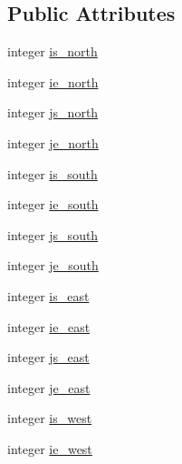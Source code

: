 \subsection*{Public Attributes}
\begin{DoxyCompactItemize}
\item 
integer \hyperlink{structfv__arrays__mod_1_1fv__regional__bc__bounds__type_a0f8c09e12e76033c808a3d6deb8b6774}{is\-\_\-north}
\item 
integer \hyperlink{structfv__arrays__mod_1_1fv__regional__bc__bounds__type_ab7c3cb5f65404b6883bbcc83e2bf9e42}{ie\-\_\-north}
\item 
integer \hyperlink{structfv__arrays__mod_1_1fv__regional__bc__bounds__type_a6c1b56a3e80896fc5145e1361807c31d}{js\-\_\-north}
\item 
integer \hyperlink{structfv__arrays__mod_1_1fv__regional__bc__bounds__type_a23a8fdcf24b84b603dab684fc87bb768}{je\-\_\-north}
\item 
integer \hyperlink{structfv__arrays__mod_1_1fv__regional__bc__bounds__type_a1946f18cfc16184c27bd77cad7325287}{is\-\_\-south}
\item 
integer \hyperlink{structfv__arrays__mod_1_1fv__regional__bc__bounds__type_acd8c3828a618efa6f9a7262b36c79148}{ie\-\_\-south}
\item 
integer \hyperlink{structfv__arrays__mod_1_1fv__regional__bc__bounds__type_ad8b75dda59b27edf80fc7ade6aa81153}{js\-\_\-south}
\item 
integer \hyperlink{structfv__arrays__mod_1_1fv__regional__bc__bounds__type_a8c5ab0960754f55008516230a1403e12}{je\-\_\-south}
\item 
integer \hyperlink{structfv__arrays__mod_1_1fv__regional__bc__bounds__type_a510bfddf983d15876a7819ebc3861291}{is\-\_\-east}
\item 
integer \hyperlink{structfv__arrays__mod_1_1fv__regional__bc__bounds__type_a34c26162b5ada53ebb8a5dd38ee6205d}{ie\-\_\-east}
\item 
integer \hyperlink{structfv__arrays__mod_1_1fv__regional__bc__bounds__type_aec5de2eb1fbc49c0ab3301f8a9833d43}{js\-\_\-east}
\item 
integer \hyperlink{structfv__arrays__mod_1_1fv__regional__bc__bounds__type_a0ec3990bb87f0052d6480199a51520d1}{je\-\_\-east}
\item 
integer \hyperlink{structfv__arrays__mod_1_1fv__regional__bc__bounds__type_a3a14693363d3959083d86452ba8f6fd6}{is\-\_\-west}
\item 
integer \hyperlink{structfv__arrays__mod_1_1fv__regional__bc__bounds__type_a9990faf4364132d331d7a763dc5df36c}{ie\-\_\-west}

\end{DoxyCompactItemize}
